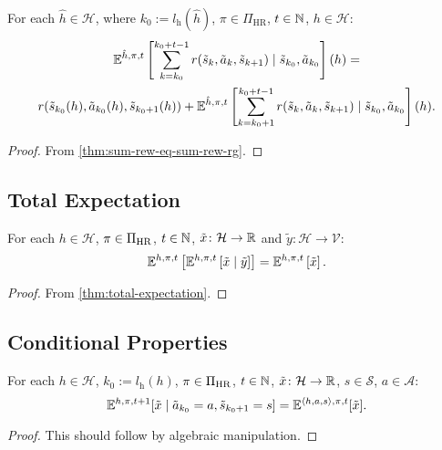 \begin{theorem}\label{thm:sum-rew-cnd}
For each $\hat{h}\in \mathcal{H}$, where $k_0:=l_{\mathrm{h}}(\hat{h})$, $\pi \in \Pi_{\mathrm{HR}}$, $t\in \mathbb{N}$, $h\in \mathcal{H}$:
\begin{gather*}
  \mathbb{E}^{\hat{h}, \pi, t} \left[ \sum_{k=k_0}^{k_0+t-1}  r(\tilde{s}_k, \tilde{a}_k, \tilde{s}_{k+1}) \mid  \tilde{s}_{k_0}, \tilde{a}_{k_0}\right](h)
  =\\
r(\tilde{s}_{k_0}(h), \tilde{a}_{k_0}(h), \tilde{s}_{k_0+1}(h)) + \mathbb{E}^{\hat{h}, \pi, t} \left[ \sum_{k=k_0+1}^{k_0+t-1}  r(\tilde{s}_k, \tilde{a}_k, \tilde{s}_{k+1}) \mid  \tilde{s}_{k_0}, \tilde{a}_{k_0}\right](h).
\end{gather*}  
\end{theorem}
\begin{proof}
 From \cref{thm:sum-rew-eq-sum-rew-rg}. 
\end{proof}

\subsection{Total Expectation}

\begin{theorem} \label{thm:total-expectation-h}
  For each $h\in \mathcal{H}$, $\pi\in \Pi_{\mathrm{HR}}$, $t\in \mathbb{N}$, $\tilde{x}\colon \mathcal{H} \to \mathbb{R}$ and $\tilde{y}\colon \mathcal{H} \to \mathcal{V}$:
  \[
    \mathbb{E}^{h, \pi, t} \left[ \mathbb{E}^{h, \pi, t} \left[  \tilde{x} \mid  \tilde{y} \right] \right]
    =
    \mathbb{E}^{h, \pi, t} \left[ \tilde{x} \right].
  \]
\end{theorem}
\begin{proof}
From \cref{thm:total-expectation}.
\end{proof}

\subsection{Conditional Properties}

\begin{theorem} \label{thm:exph-cond-eq-hist}
For each $h\in \mathcal{H}$, $k_0 := l_{\mathrm{h}}(h)$, $\pi\in \Pi_{\mathrm{HR}}$, $t\in \mathbb{N}$, $\tilde{x}\colon \mathcal{H} \to \mathbb{R}$, $s\in \mathcal{S}$, $a\in \mathcal{A}$:
\[
  \mathbb{E}^{h,\pi,t+1}[\tilde{x} \mid \tilde{a}_{k_0} = a, \tilde{s}_{k_0+1} = s]
  =
  \mathbb{E}^{\langle h, a, s\rangle,\pi,t}[\tilde{x}].
\]
\end{theorem}
\begin{proof}
This should follow by algebraic manipulation.
\end{proof}

